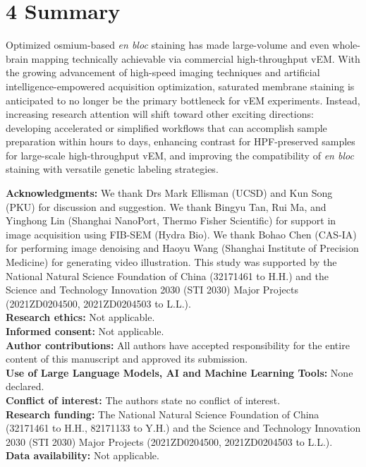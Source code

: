 \documentclass{article}
\begin{document}
\section*{4 Summary}

\noindent Optimized osmium-based \emph{en bloc} staining has made large-volume and even whole-brain mapping technically achievable via commercial high-throughput vEM. With the growing advancement of high-speed imaging techniques and artificial intelligence-empowered acquisition optimization, saturated membrane staining is anticipated to no longer be the primary bottleneck for vEM experiments. Instead, increasing research attention will shift toward other exciting directions: developing accelerated or simplified workflows that can accomplish sample preparation within hours to days, enhancing contrast for HPF-preserved samples for large-scale high-throughput vEM, and improving the compatibility of \emph{en bloc} staining with versatile genetic labeling strategies.

\bigskip
\noindent\textbf{Acknowledgments:} We thank Drs Mark Ellisman (UCSD) and Kun Song (PKU) for discussion and suggestion. We thank Bingyu Tan, Rui Ma, and Yinghong Lin (Shanghai NanoPort, Thermo Fisher Scientific) for support in image acquisition using FIB-SEM (Hydra Bio). We thank Bohao Chen (CAS-IA) for performing image denoising and Haoyu Wang (Shanghai Institute of Precision Medicine) for generating video illustration. This study was supported by the National Natural Science Foundation of China (32171461 to H.H.) and the Science and Technology Innovation 2030 (STI 2030) Major Projects (2021ZD0204500, 2021ZD0204503 to L.L.).\\
\textbf{Research ethics:} Not applicable.\\
\textbf{Informed consent:} Not applicable.\\
\textbf{Author contributions:} All authors have accepted responsibility for the entire content of this manuscript and approved its submission.\\
\textbf{Use of Large Language Models, AI and Machine Learning Tools:} None declared.\\
\textbf{Conflict of interest:} The authors state no conflict of interest.\\
\textbf{Research funding:} The National Natural Science Foundation of China (32171461 to H.H., 82171133 to Y.H.) and the Science and Technology Innovation 2030 (STI 2030) Major Projects (2021ZD0204500, 2021ZD0204503 to L.L.).\\
\textbf{Data availability:} Not applicable.
\end{document}
